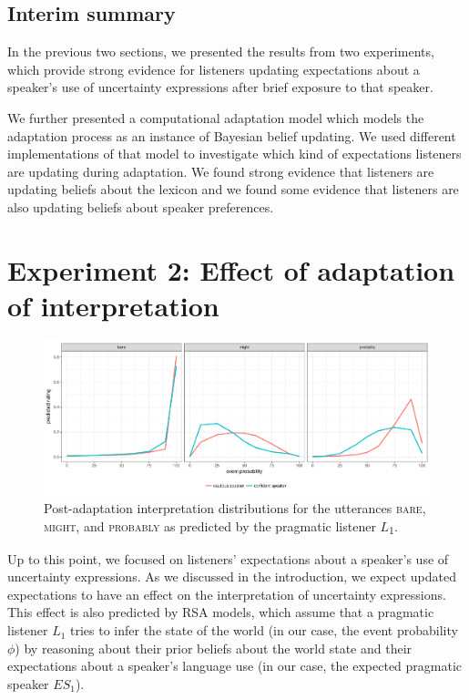 \documentclass[lucida,biblatex]{sp} %
\begin{document}
\subsection{Interim summary}

In the previous two sections, we presented the results from two experiments, which provide strong evidence for
listeners updating expectations about a speaker's use of uncertainty expressions after brief
exposure to that speaker. 

We further presented a computational adaptation model which models the adaptation
process as an instance of Bayesian belief updating. We used different implementations
of that model to investigate which kind of expectations listeners are updating during adaptation.
We found strong evidence that listeners are updating beliefs about the lexicon and 
we found some evidence that
listeners are also updating beliefs about speaker preferences.

\section{Experiment 2: Effect of adaptation of interpretation}
\label{sec:exp-model-interpretation}

\begin{figure}
  \includegraphics[width=\textwidth]{plots/adaptation-posterior-comp.pdf}
  \caption{Post-adaptation interpretation distributions for the utterances  \textsc{bare}, \textsc{might}, and \textsc{probably} as predicted by the pragmatic listener $L$\textsubscript{$1$}. \label{fig:post-exposure-comp}}
\end{figure}

Up to this point, we focused on listeners' expectations about a speaker's use of uncertainty expressions. As we discussed
in the introduction, we expect updated expectations to have an effect on the interpretation of uncertainty expressions. This
effect is also predicted by RSA models,  which assume that a pragmatic listener $L_1$ tries to infer the state of the world (in our case, the event probability $\phi$) by reasoning
about their prior beliefs about the world state and their expectations about a speaker's language use (in our case, the expected pragmatic speaker $ES_{1}$).
\end{document}
